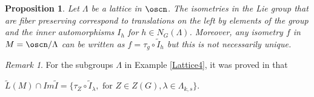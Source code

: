 \documentclass[11pt]{amsart}
\theoremstyle{plain}
\newtheorem{prop}[thm]{Proposition}
\theoremstyle{definition}
\theoremstyle{remark}
\newtheorem{rem}{Remark}
\begin{document}
\begin{prop}
 Let $\Lambda$ be a lattice in $\oscn$. The isometries in the Lie group that are fiber preserving correspond to translations on the left by elements of the group and the inner automorphisms $I_h$ for $h\in N_G(\Lambda)$. Moreover, 
 any isometry $f$ in $M=\oscn/\Lambda$ can be written as $f=\tau_g\circ \widetilde{I}_h$ but this  is not necessarily unique. 
\end{prop}

\begin{rem} For the subgroups $\Lambda$ in Example \ref{Lattice4}, it was proved in \cite{BOV}  that 
	
	$\tilde{L}(M)\cap Im \tilde{I}=\{\tau_Z\circ\widetilde{I}_{\lambda}, \mbox{ for } Z\in Z(G), \lambda\in \Lambda_{k,s}\}$. 
	\end{rem}
	
\end{document}
